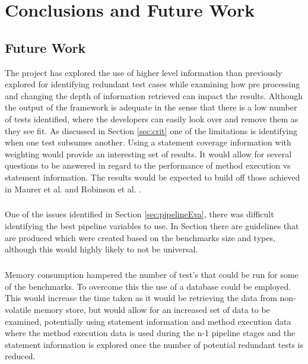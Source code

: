 \chapter{Conclusions and Future Work}\label{C:future}

\section{Future Work}
The project has explored the use of higher level information than previously explored for identifying redundant test cases while examining how pre processing and changing the depth of information retrieved can impact the results. Although the output of the framework is adequate in the sense that there is a low number of tests identified, where the developers can easily look over and remove them as they see fit. As discussed in Section \ref{sec:crit} one of the limitations is identifying when one test subsumes another. Using a statement coverage information with weighting would provide an interesting set of results. It would allow for several questions to be answered in regard to the performance of method execution vs statement information. The results would be expected to build off those achieved in Maurer et al. \cite{li2008static}  and Robinson et al. \cite{koochakzadeh2009test}. 
\paragraph{}
One of the issues identified in Section \ref{sec:pipelineEva}, there was difficult identifying the best pipeline variables to use. In Section  there are guidelines that are produced which were created based on the benchmarks size and types, although this would highly likely to not be universal. 
\paragraph{}
Memory consumption hampered the number of test's that could be run for some of the benchmarks. To overcome this the use of a database could be employed. This would increase the time taken as it would be retrieving the data from non-volatile memory store, but would allow for an increased set of data to be examined, potentially using statement information and method execution data where the method execution data is used during the n-1 pipeline stages and the statement information is explored once the number of potential redundant tests is reduced. 
\\
\\


